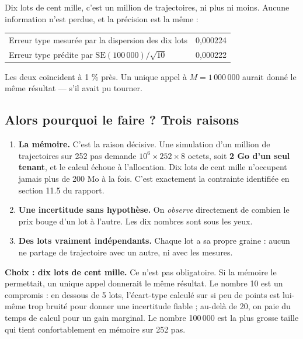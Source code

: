 \documentclass[11pt,a4paper]{article}
\begin{document}
Dix lots de cent mille, c'est un million de trajectoires, ni plus ni moins.
Aucune information n'est perdue, et la précision est la même :

\begin{center}
\small
\begin{tabular}{lc}
\toprule
Erreur type mesurée par la dispersion des dix lots & 0,000224 \\
Erreur type prédite par $\text{SE}(100\,000)/\sqrt{10}$ & 0,000222 \\
\bottomrule
\end{tabular}
\end{center}

Les deux coïncident à 1 \% près. Un unique appel à $M = 1\,000\,000$ aurait
donné le même résultat --- s'il avait pu tourner.

\subsection{Alors pourquoi le faire ? Trois raisons}

\begin{enumerate}\setlength\itemsep{2pt}
\item \textbf{La mémoire.} C'est la raison décisive. Une simulation d'un
      million de trajectoires sur 252 pas demande $10^6 \times 252 \times 8$
      octets, soit \textbf{2 Go d'un seul tenant}, et le calcul échoue à
      l'allocation. Dix lots de cent mille n'occupent jamais plus de 200 Mo à
      la fois. C'est exactement la contrainte identifiée en section 11.5 du
      rapport.
\item \textbf{Une incertitude sans hypothèse.} On \emph{observe} directement de
      combien le prix bouge d'un lot à l'autre. Les dix nombres sont sous les
      yeux.
\item \textbf{Des lots vraiment indépendants.} Chaque lot a sa propre graine :
      aucun ne partage de trajectoire avec un autre, ni avec les mesures.
\end{enumerate}

\begin{choix}
\textbf{Choix : dix lots de cent mille.} Ce n'est pas obligatoire. Si la
mémoire le permettait, un unique appel donnerait le même résultat. Le nombre 10
est un compromis : en dessous de 5 lots, l'écart-type calculé sur si peu de
points est lui-même trop bruité pour donner une incertitude fiable ; au-delà
de 20, on paie du temps de calcul pour un gain marginal. Le nombre 100\,000
est la plus grosse taille qui tient confortablement en mémoire sur 252 pas.
\end{choix}
\end{document}
